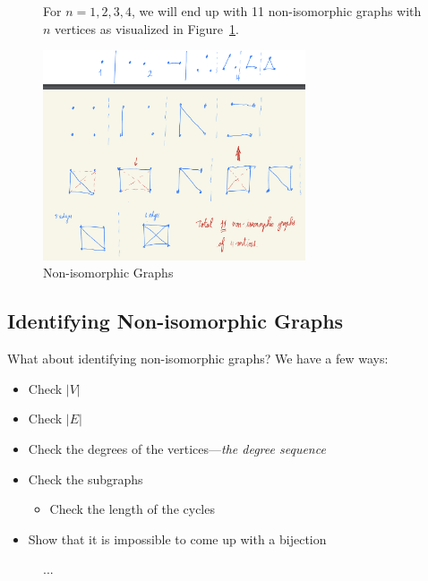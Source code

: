 \begin{figure}
\begin{nexample}
  For \(n = 1, 2, 3, 4\), we will end up with 11 non-isomorphic graphs with \(n\) vertices as visualized in Figure~\ref{fig:non-isomorphic-graphs}.

    \begin{center}
      \includegraphics[width=0.69\textwidth]{figures/l01/non-isomorphic-graphs}
    \end{center}
    \caption{Non-isomorphic Graphs}\label{fig:non-isomorphic-graphs}
\end{nexample}
\end{figure}

\subsection*{Identifying Non-isomorphic Graphs}

What about identifying non-isomorphic graphs? We have a few ways:
\begin{itemize}
  \item Check \(|V|\)
  \item Check \(|E|\)
  \item Check the degrees of the vertices---\textit{the degree sequence}
  \item Check the subgraphs
    \begin{itemize}
      \item Check the length of the cycles
    \end{itemize}
  \item Show that it is impossible to come up with a bijection
\end{itemize}

\begin{figure}[ht]
\begin{nexample}
  ...
\end{nexample}
\end{figure}

